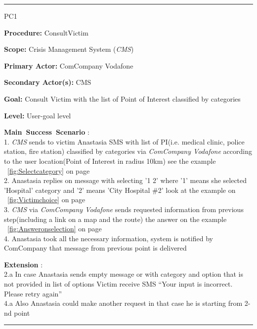 \vspace{0.5cm}
\hrule
\begin{lyxlist}{PC1}
\small{
\item [\textbf{Procedure:}] ConsultVictim
\item [\textbf{Scope:}] Crisis Management System (\emph{CMS})
\item [\textbf{Primary Actor:}] ComCompany Vodafone
\item [\textbf{Secondary Actor(s):}] CMS
\item [\textbf{Goal:}] Consult Victim with the list of Point of Interest
classified by categories
\item [\textbf{Level:}] User-goal level 

\item [\textbf{Main~Success~Scenario}]:\\
1. \emph{CMS} sends to victim Anastasia SMS with list of PI(i.e. medical clinic,
police station, fire station) classified by categories via \emph{ComCompany Vodafone}
according to the user location(Point of Interest in radius 10km) see the example ~\ref{fig:Selectcategory} on page~\pageref{fig:Selectcategory}\\
2. Anastasia replies on message with selecting '1 2' where '1' means she
selected 'Hospital' category and '2' means 'City Hospital \#2'
look at the example on ~\ref{fig:Victimchoice} on
page~\pageref{fig:Victimchoice}\\
3. \emph{CMS} via \emph{ComCompany Vodafone} sends requested information from
previous step(including a link on a map and the route) the answer on the example
~\ref{fig:Answeronselection} on page~\pageref{fig:Answeronselection}\\
4. Anastasia took all the necessary information, system is notified by
ComCompany that message from previous point is delivered\\

\item [\textbf{Extension}]:\\ 
2.a In case Anastasia sends empty message or with category and option that is not
provided in list of options Victim receive SMS ``Your input is incorrect. Please
retry again''\\
4.a Also Anastasia could make another request in that case he is starting from 2-nd
point\\
}
\end{lyxlist}
\hrule
\vspace{0.5cm}

